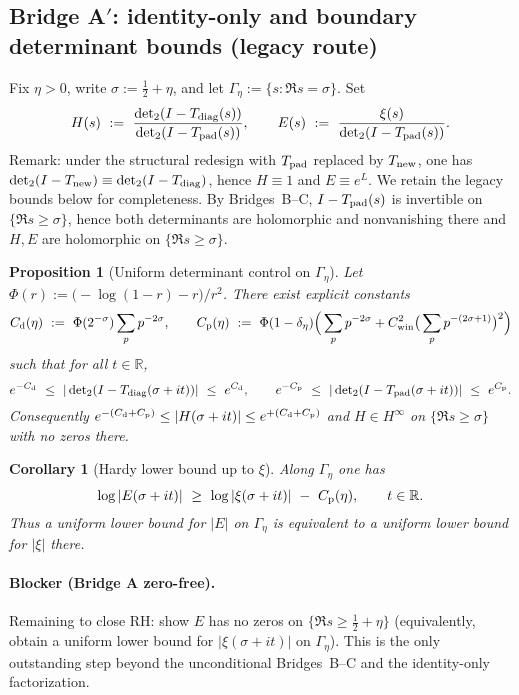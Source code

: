 \documentclass[11pt]{article}
\newtheorem{proposition}[theorem]{Proposition}
\newtheorem{corollary}[theorem]{Corollary}
\theoremstyle{definition}
\theoremstyle{remark}
\newcommand{\R}{\mathbb{R}}
\begin{document}
\subsection*{Bridge A$'$: identity-only and boundary determinant bounds (legacy route)}

Fix $\eta>0$, write $\sigma:=\tfrac12+\eta$, and let $\Gamma_\eta:=\{s:\Re s=\sigma\}$. Set
\[
  H(s)\ :=\ \frac{\det\nolimits_{2}(I-T_{\rm diag}(s))}{\det\nolimits_{2}(I-T_{\rm pad}(s))},\qquad
  E(s)\ :=\ \frac{\xi(s)}{\det\nolimits_{2}(I-T_{\rm pad}(s))}.
\]
\noindent Remark: under the structural redesign with $T_{\rm pad}$ replaced by $T_{\rm new}$, one has $\det_2(I-T_{\rm new})\equiv\det_2(I-T_{\rm diag})$, hence $H\equiv 1$ and $E\equiv e^{L}$. We retain the legacy bounds below for completeness.
By Bridges~B--C, $I-T_{\rm pad}(s)$ is invertible on $\{\Re s\ge \sigma\}$, hence both determinants are holomorphic and nonvanishing there and $H,E$ are holomorphic on $\{\Re s\ge\sigma\}$.

\begin{proposition}[Uniform determinant control on $\Gamma_\eta$]\label{prop:det-bounds}
Let $\Phi(r):=\big(-\log(1-r)-r\big)/r^{2}$. There exist explicit constants
\[
  C_{\rm d}(\eta)\ :=\ \Phi(2^{-\sigma})\sum_{p}p^{-2\sigma},\qquad
  C_{\rm p}(\eta)\ :=\ \Phi(1-\delta_\eta)\Big(\sum_{p}p^{-2\sigma}+C_{\rm win}^{2}\big(\sum_{p}p^{-(2\sigma+1)}\big)^{2}\Big)
\]
such that for all $t\in\R$,
\[
  e^{-C_{\rm d}}\ \le\ |\det\nolimits_{2}(I-T_{\rm diag}(\sigma+it))|\ \le\ e^{C_{\rm d}},\qquad
  e^{-C_{\rm p}}\ \le\ |\det\nolimits_{2}(I-T_{\rm pad}(\sigma+it))|\ \le\ e^{C_{\rm p}}.
\]
Consequently $e^{-(C_{\rm d}+C_{\rm p})}\le |H(\sigma+it)|\le e^{+(C_{\rm d}+C_{\rm p})}$ and $H\in H^{\infty}$ on $\{\Re s\ge\sigma\}$ with no zeros there.
\end{proposition}

\begin{corollary}[Hardy lower bound up to $\xi$]\label{cor:hardy-lower-E}
Along $\Gamma_\eta$ one has
\[\log|E(\sigma+it)|\ \ge\ \log|\xi(\sigma+it)|\ -\ C_{\rm p}(\eta),\qquad t\in\R.\]
Thus a uniform lower bound for $|E|$ on $\Gamma_\eta$ is equivalent to a uniform lower bound for $|\xi|$ there.
\end{corollary}

\paragraph{Blocker (Bridge A zero-free).}
Remaining to close RH: show $E$ has no zeros on $\{\Re s\ge \tfrac12+\eta\}$ (equivalently, obtain a uniform lower bound for $|\xi(\sigma+it)|$ on $\Gamma_\eta$). This is the only outstanding step beyond the unconditional Bridges~B--C and the identity-only factorization.
\end{document}
